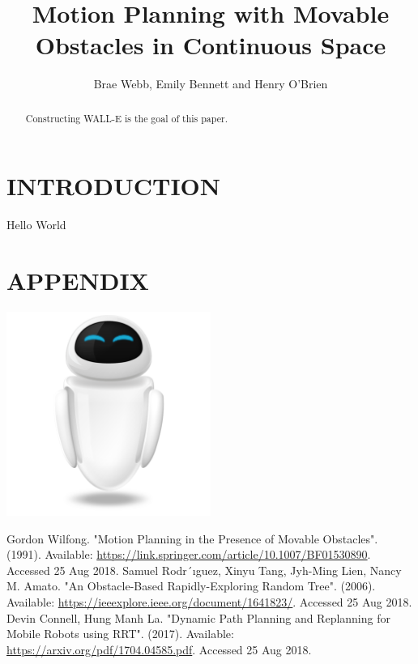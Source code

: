 \documentclass[a4paper, 10pt, conference]{IEEEtran}
\title{\LARGE \bf
Motion Planning with Movable Obstacles in Continuous Space
}
\author{Brae Webb, Emily Bennett and Henry O'Brien}
\begin{document}
\maketitle
\thispagestyle{empty}
\pagestyle{empty}

\begin{abstract}
Constructing WALL-E is the goal of this paper.
\end{abstract}

\section{INTRODUCTION}
Hello World


\section*{APPENDIX}
\includegraphics[width=0.5\textwidth]{../logo.png}


\begin{thebibliography}{99}

 Gordon Wilfong. "Motion Planning in the Presence of Movable Obstacles". (1991). Available: \url{https://link.springer.com/article/10.1007/BF01530890}. Accessed 25 Aug 2018.
 Samuel Rodr´ıguez, Xinyu Tang, Jyh-Ming Lien, Nancy M. Amato. "An Obstacle-Based Rapidly-Exploring Random Tree". (2006). Available: \url{https://ieeexplore.ieee.org/document/1641823/}. Accessed 25 Aug 2018.
 Devin Connell, Hung Manh La. "Dynamic Path Planning and Replanning for Mobile Robots using RRT". (2017). Available: \url{https://arxiv.org/pdf/1704.04585.pdf}. Accessed 25 Aug 2018.

\end{thebibliography}
\end{document}
